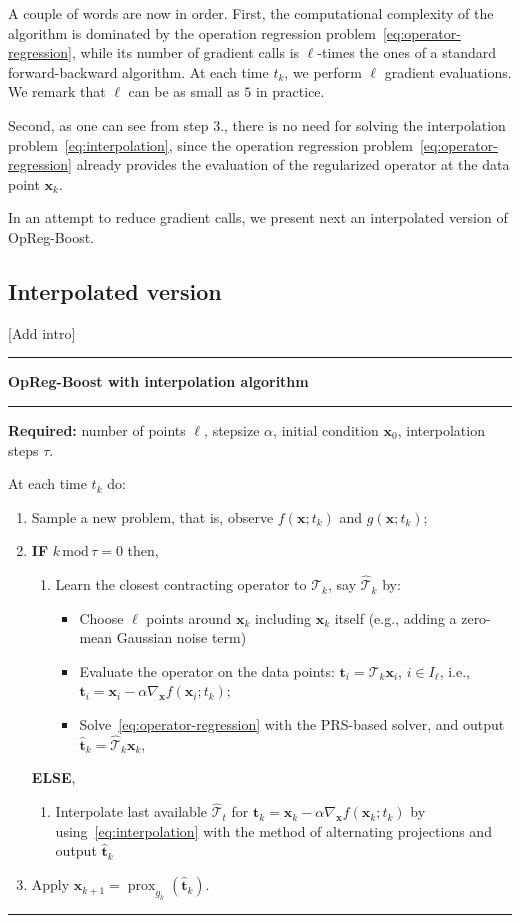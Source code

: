 \documentclass{article}
\DeclareMathOperator{\prox}{prox}
\newcommand{\tv}{\mathbold{t}}
\newcommand{\x}{\mathbold{x}}
\newcommand{\T}{\mathcal{T}}
\newcommand{\andrea}[1]{{\color{red}[#1]}}
\begin{document}
A couple of words are now in order. First, the computational complexity of the algorithm is dominated by the operation regression problem~\eqref{eq:operator-regression}, while its number of gradient calls is $\ell$-times the ones of a standard forward-backward algorithm.  At each time $t_k$, we perform $\ell$ gradient evaluations. We remark that $\ell$ can be as small as $5$ in practice. 

Second, as one can see from step 3., there is no need for solving the interpolation problem~\eqref{eq:interpolation}, since the operation regression problem~\eqref{eq:operator-regression} already provides the evaluation of the regularized operator at the data point $\x_k$. 

In an attempt to reduce gradient calls, we present next an interpolated version of OpReg-Boost. 


\subsection{Interpolated version}

\andrea{Add intro}


\smallskip
\smallskip
\hrule
{\bf OpReg-Boost with interpolation algorithm}
\smallskip
\hrule
{\bf Required:} number of points $\ell$, stepsize $\alpha$, initial condition $\x_0$, interpolation steps $\tau$.

At each time $t_k$ do:
\begin{enumerate}
	\item Sample a new problem, that is, observe $f(\x; t_k)$ and $g(\x; t_k)$;
	\item {\bf IF} $k \,\textrm{mod}\, \tau = 0$ then, 
	\begin{enumerate}
	\item Learn the closest contracting operator to $\T_{k}$, say $\hat{\T}_k$ by:
	\begin{itemize}
		\item Choose $\ell$ points around $\x_k$ including $\x_k$ itself (e.g., adding a zero-mean Gaussian noise term)
		\item Evaluate the operator on the data points: $\tv_i = \T_{k} \x_i$, $i\in I_{\ell}$, i.e., $\tv_i = \x_i - \alpha \nabla_{\x} f(\x_i; t_k)$;
		\item Solve~\eqref{eq:operator-regression} with the PRS-based solver, and output $\hat{\tv}_k = \hat{\T}_k \x_k$,
\end{itemize}
\end{enumerate}
	{\bf ELSE},
	\begin{enumerate}
	\item Interpolate last available $\hat{\T}_t$ for $\tv_k = \x_k - \alpha \nabla_{\x} f(\x_k; t_k)$ by using~\eqref{eq:interpolation} with the method of alternating projections and output $\hat{\tv}_k$ 
\end{enumerate}
	\item Apply $\x_{k+1} = \prox_{g_k} (\hat{\tv}_k) $.
\end{enumerate}
\smallskip
\hrule
\end{document}
